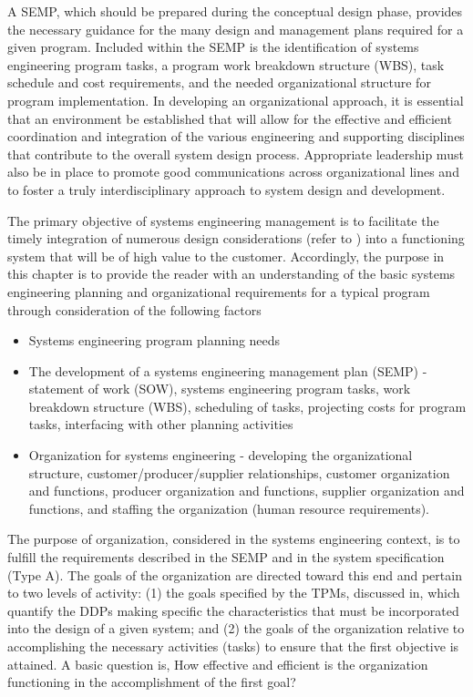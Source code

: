 A SEMP, which should be prepared during the conceptual design phase, provides the necessary guidance for the many design and management plans required for a given program. Included within the SEMP is the identification of systems engineering program tasks, a program work breakdown structure (WBS), task schedule and cost requirements, and the needed organizational structure for program implementation. In developing an organizational approach, it is essential that an environment be established that will allow for the effective and efficient coordination and integration of the various engineering and supporting disciplines that contribute to the overall system design process. Appropriate leadership must also be in place to promote good communications across organizational lines and to foster a truly interdisciplinary approach to system design and development.

The primary objective of systems engineering management is to facilitate the timely integration of numerous design considerations (refer to ) into a functioning system that will be of high value to the customer. Accordingly, the purpose in this chapter is to provide the reader with an understanding of the basic systems engineering planning and organizational requirements for a typical program through consideration of the following factors
\begin{itemize}
\item Systems engineering program planning needs
\item The development of a systems engineering management plan (SEMP) - statement of work (SOW), systems engineering program tasks, work breakdown structure (WBS), scheduling of tasks, projecting costs for program tasks, interfacing with other planning activities
\item Organization for systems engineering - developing the organizational structure, customer/producer/supplier relationships, customer organization and functions, producer organization and functions, supplier organization and functions, and staffing the organization (human resource requirements).
\end{itemize}

The purpose of organization, considered in the systems engineering context, is to fulfill the requirements described in the SEMP and in the system specification (Type A). The goals of the organization are directed toward this end and pertain to two levels of activity: (1) the goals specified by the TPMs, discussed in, which quantify the DDPs making specific the characteristics that must be incorporated into the design of a given system; and (2) the goals of the organization relative to accomplishing the necessary activities (tasks) to ensure that the first objective is attained. A basic question is, How effective and efficient is the organization functioning in the accomplishment of the first goal?

